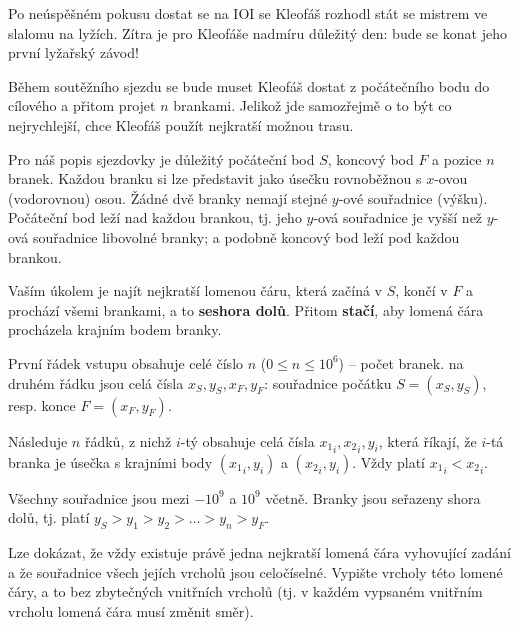 
\usepackage[czech]{babel}





Po neúspěšném pokusu dostat se na IOI se Kleofáš rozhodl stát se mistrem ve slalomu na lyžích.
Zítra je pro Kleofáše nadmíru důležitý den: bude se konat jeho první lyžařský závod!

Během soutěžního sjezdu se bude muset Kleofáš dostat z počátečního bodu do cílového
a přitom projet $n$ brankami. Jelikož jde samozřejmě o to být co nejrychlejší,
chce Kleofáš použít nejkratší možnou trasu.


Pro náš popis sjezdovky je důležitý počáteční bod $S$, koncový bod $F$ a pozice $n$ 
branek. Každou branku si lze představit jako úsečku rovnoběžnou s $x$-ovou (vodorovnou) osou. Žádné dvě branky
nemají stejné $y$-ové souřadnice (výšku). Počáteční bod leží nad každou brankou, tj. jeho $y$-ová souřadnice je vyšší
než $y$-ová souřadnice libovolné branky; a podobně koncový bod leží pod každou brankou.

Vaším úkolem je najít nejkratší lomenou čáru, která začíná v $S$, končí v $F$ a prochází všemi brankami,
a to \textbf{seshora dolů}. Přitom \textbf{stačí}, aby lomená čára procházela krajním bodem branky.


První řádek vstupu obsahuje celé číslo $n$ ($0 \leq n \leq 10^6$) -- počet branek.
na druhém řádku jsou celá čísla $x_S, y_S, x_F, y_F$: souřadnice počátku $S = (x_S, y_S)$,
resp. konce $F = (x_F, y_F)$.

Následuje $n$ řádků, z nichž $i$-tý obsahuje celá čísla ${x_1}_i, {x_2}_i, {y}_i$, která říkají, že $i$-tá branka
je úsečka s krajními body $({x_1}_i, y_i)$ a $({x_2}_i, y_i)$. Vždy platí ${x_1}_i < {x_2}_i$.

Všechny souřadnice jsou mezi $-10^9$ a $10^9$ včetně. Branky jsou seřazeny shora dolů, tj. platí
$y_S > y_1 > y_2 > \dots > y_n > y_F$.


Lze dokázat, že vždy existuje právě jedna nejkratší lomená čára vyhovující zadání a že souřadnice všech jejích vrcholů jsou celočíselné.
Vypište vrcholy této lomené čáry, a to bez zbytečných vnitřních vrcholů (tj. v každém vypsaném vnitřním vrcholu lomená čára musí změnit směr).

